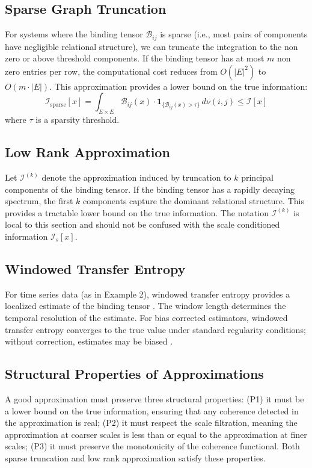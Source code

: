 \documentclass[12pt]{article}
\theoremstyle{definition}
\begin{document}
\subsection{Sparse Graph Truncation}
For systems where the binding tensor $\mathcal{B}_{ij}$ is sparse (i.e., most pairs of components have negligible relational structure), we can truncate the integration to the non zero or above threshold components. If the binding tensor has at most $m$ non zero entries per row, the computational cost reduces from $O(|E|^2)$ to $O(m \cdot |E|)$. This approximation provides a lower bound on the true information:
\begin{equation}
\mathcal{I}_{\text{sparse}}[x] = \int_{E \times E} \mathcal{B}_{ij}(x) \cdot \mathbf{1}_{\{\mathcal{B}_{ij}(x) > \tau\}} \, d\nu(i,j) \leq \mathcal{I}[x]
\end{equation}
where $\tau$ is a sparsity threshold.

\subsection{Low Rank Approximation}
Let $\mathcal{I}^{(k)}$ denote the approximation induced by truncation to $k$ principal components of the binding tensor. If the binding tensor has a rapidly decaying spectrum, the first $k$ components capture the dominant relational structure. This provides a tractable lower bound on the true information. The notation $\mathcal{I}^{(k)}$ is local to this section and should not be confused with the scale conditioned information $\mathcal{I}_s[x]$.

\subsection{Windowed Transfer Entropy}
For time series data (as in Example 2), windowed transfer entropy provides a localized estimate of the binding tensor \cite{schreiber2000measuring}. The window length determines the temporal resolution of the estimate. For bias corrected estimators, windowed transfer entropy converges to the true value under standard regularity conditions; without correction, estimates may be biased \cite{paninski2003estimation}.

\subsection{Structural Properties of Approximations}
A good approximation must preserve three structural properties: (P1) it must be a lower bound on the true information, ensuring that any coherence detected in the approximation is real; (P2) it must respect the scale filtration, meaning the approximation at coarser scales is less than or equal to the approximation at finer scales; (P3) it must preserve the monotonicity of the coherence functional. Both sparse truncation and low rank approximation satisfy these properties.
\end{document}
